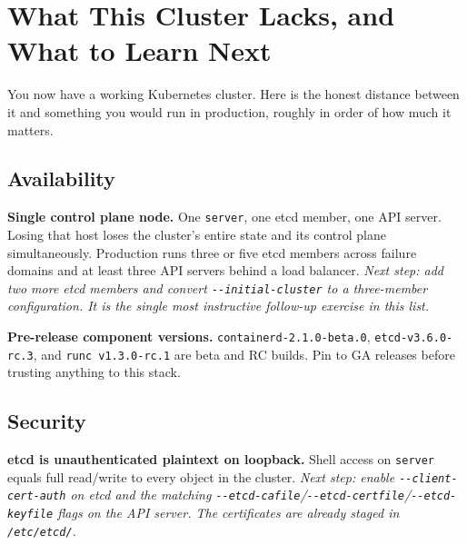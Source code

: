 \documentclass[11pt,oneside]{report}
\begin{document}
\hypertarget{app-next}{%
\chapter{What This
Cluster Lacks, and
What to Learn
Next}\label{app-next}}

You now have a
working Kubernetes
cluster. Here is the
honest distance
between it and
something you would
run in production,
roughly in order of
how much it matters.

\hypertarget{availability}{%
\section{Availability}\label{availability}}

\textbf{Single
control plane node.}
One \texttt{server},
one etcd member, one
API server. Losing
that host loses the
cluster's entire
state and its
control plane
simultaneously.
Production runs
three or five etcd
members across
failure domains and
at least three API
servers behind a
load balancer.
\emph{Next step: add
two more etcd
members and convert
\texttt{-\/-initial-}\allowbreak{}\texttt{cluster}
to a three-member
configuration. It is
the single most
instructive
follow-up exercise
in this list.}

\textbf{Pre-release
component versions.}
\texttt{containerd-}\allowbreak{}\texttt{2.}\allowbreak{}\texttt{1.}\allowbreak{}\texttt{0-}\allowbreak{}\texttt{beta.}\allowbreak{}\texttt{0},
\texttt{etcd-}\allowbreak{}\texttt{v3.}\allowbreak{}\texttt{6.}\allowbreak{}\texttt{0-}\allowbreak{}\texttt{rc.}\allowbreak{}\texttt{3},
and
\texttt{runc\ v1.}\allowbreak{}\texttt{3.}\allowbreak{}\texttt{0-}\allowbreak{}\texttt{rc.}\allowbreak{}\texttt{1}
are beta and RC
builds. Pin to GA
releases before
trusting anything to
this stack.

\hypertarget{security}{%
\section{Security}\label{security}}

\textbf{etcd is
unauthenticated
plaintext on
loopback.} Shell
access on
\texttt{server}
equals full
read/write to every
object in the
cluster. \emph{Next
step: enable
\texttt{-\/-client-}\allowbreak{}\texttt{cert-}\allowbreak{}\texttt{auth}
on etcd and the
matching
\texttt{-\/-etcd-cafile}/\texttt{-\/-etcd-certfile}/\texttt{-\/-etcd-keyfile}
flags on the API
server. The
certificates are
already staged in
\texttt{/etc/etcd/}.}
\end{document}
